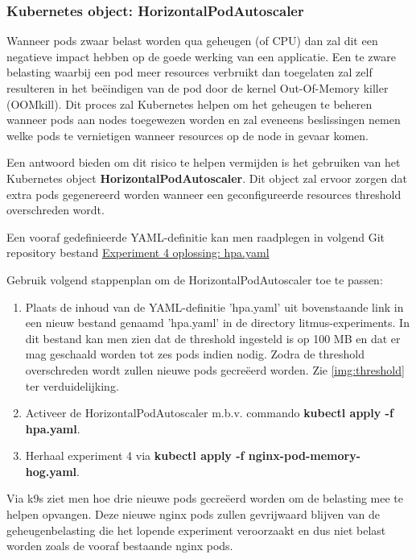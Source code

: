 \subsubsection{Kubernetes object: HorizontalPodAutoscaler}

Wanneer pods zwaar belast worden qua geheugen (of CPU) dan zal dit een negatieve impact hebben op de goede werking van een applicatie. Een te zware belasting waarbij een pod meer resources verbruikt dan toegelaten zal zelf resulteren in het beëindigen van de pod door de kernel Out-Of-Memory killer (OOMkill). Dit proces zal Kubernetes helpen om het geheugen te beheren wanneer pods aan nodes toegewezen worden en zal eveneens beslissingen nemen welke pods te vernietigen wanneer resources op de node in gevaar komen. \autocite{Alletto2021} 

Een antwoord bieden om dit risico te helpen vermijden is het gebruiken van het Kubernetes object {\bf HorizontalPodAutoscaler}. Dit object zal ervoor zorgen dat extra pods gegenereerd worden wanneer een geconfigureerde resources threshold overschreden wordt.  

Een vooraf gedefinieerde YAML-definitie kan men raadplegen in volgend Git repository bestand  \href{https://github.com/KenBruggeman/BP\textunderscore 21-22/blob/master/bachelorproef/docs/litmus%20experimenten/hpa.yaml}{Experiment 4 oplossing: hpa.yaml}

Gebruik volgend stappenplan om de HorizontalPodAutoscaler toe te passen:
\begin{enumerate}
    \item Plaats de inhoud van de YAML-definitie 'hpa.yaml' uit bovenstaande link in een nieuw bestand genaamd 'hpa.yaml' in de directory litmus-experiments. In dit bestand kan men zien dat de threshold ingesteld is op 100 MB en dat er mag geschaald worden tot zes pods indien nodig. Zodra de threshold overschreden wordt zullen nieuwe pods gecreëerd worden. Zie \ref{img:threshold} ter verduidelijking.
    \item Activeer de HorizontalPodAutoscaler m.b.v. commando {\bf kubectl apply -f hpa.yaml}.
    \item Herhaal experiment 4 via {\bf kubectl apply -f nginx-pod-memory-hog.yaml}.
\end{enumerate}    
  
Via k9s ziet men hoe drie nieuwe pods gecreëerd worden om de belasting mee te helpen opvangen.
Deze nieuwe nginx pods zullen gevrijwaard blijven van de geheugenbelasting die het lopende experiment veroorzaakt en dus niet belast worden zoals de vooraf bestaande nginx pods.  

